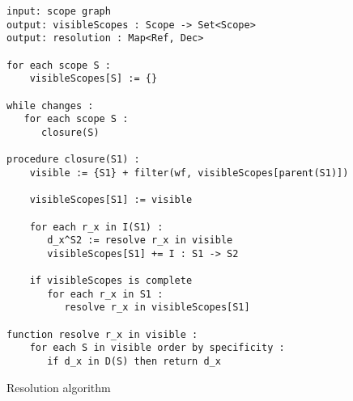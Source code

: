 \begin{figure}[p]
\begin{verbatim}
input: scope graph
output: visibleScopes : Scope -> Set<Scope>
output: resolution : Map<Ref, Dec>

for each scope S :
    visibleScopes[S] := {}

while changes :
   for each scope S :
      closure(S)

procedure closure(S1) :
    visible := {S1} + filter(wf, visibleScopes[parent(S1)])

    visibleScopes[S1] := visible

    for each r_x in I(S1) :
       d_x^S2 := resolve r_x in visible
       visibleScopes[S1] += I : S1 -> S2

    if visibleScopes is complete
       for each r_x in S1 :
          resolve r_x in visibleScopes[S1]

function resolve r_x in visible :
    for each S in visible order by specificity :
       if d_x in D(S) then return d_x
\end{verbatim}
\caption{Resolution algorithm}
\end{figure}
